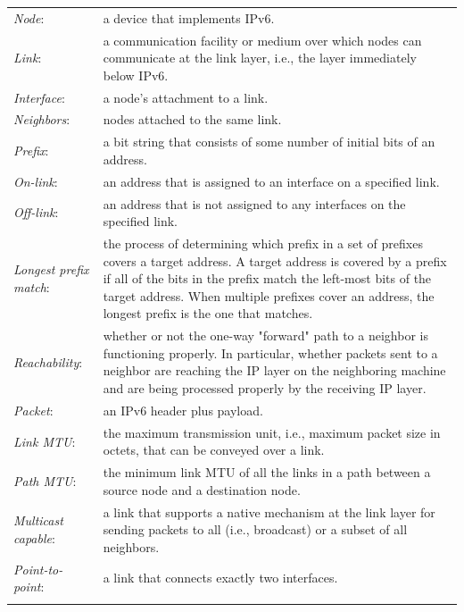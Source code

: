 \documentclass[12pt]{article}
\begin{document}
\begin{tabular}{L{3.3cm}L{11.2cm}}
\hdashline
\textit{Node}:&a device that implements IPv6.\\
\hdashline
\textit{Link}:&a communication facility or medium over which nodes can communicate at the link layer, i.e., the layer immediately below IPv6.\\
\hdashline
\textit{Interface}:&a node's attachment to a link.\\
\hdashline
\textit{Neighbors}:&nodes attached to the same link.\\
\hdashline
\textit{Prefix}:&a bit string that consists of some number of initial bits of an address.\\
\hdashline
\textit{On-link}:&an address that is assigned to an interface on a specified link.\\
\hdashline
\textit{Off-link}:&an address that is not assigned to any interfaces on the specified link.\\
\hdashline
\textit{Longest prefix match}:&the process of determining which prefix in a set of prefixes covers a target address. A target address is covered by a prefix if all of the bits in the prefix match the left-most bits of the target address. When multiple prefixes cover an address, the longest prefix is the one that matches.\\
\hdashline
\textit{Reachability}:&whether or not the one-way "forward" path to a neighbor is functioning properly. In particular, whether packets sent to a neighbor are reaching the IP layer on the neighboring machine and are being processed properly by the receiving IP layer.\\
\hdashline
\textit{Packet}:&an IPv6 header plus payload.\\
\hdashline
\textit{Link MTU}:&the maximum transmission unit, i.e., maximum packet size in octets, that can be conveyed over a link.\\
\hdashline
\textit{Path MTU}:&the minimum link MTU of all the links in a path between a source node and a destination node.\\
\hdashline
\textit{Multicast capable}:&a link that supports a native mechanism at the link layer for sending packets to all (i.e., broadcast) or a subset of all neighbors.\\
\hdashline
\textit{Point-to-point}:&a link that connects exactly two interfaces.\\
\hdashline
\end{tabular}
\end{document}
